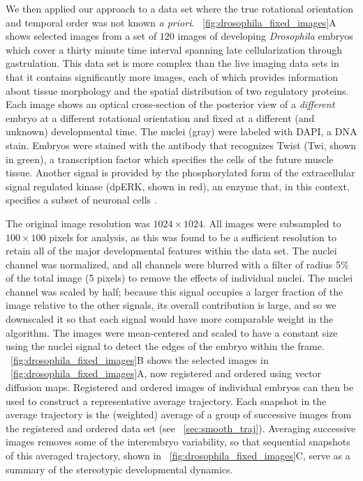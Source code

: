 We then applied our approach to a data set where the true rotational orientation and temporal order was not known {\it a priori}.
%
\fig~\ref{fig:drosophila_fixed_images}A shows selected images from a set of $120$ images of developing {\em Drosophila} embryos which cover a thirty minute time interval spanning late cellularization through gastrulation.
%
This data set is more complex than the live imaging data sets in that it contains significantly more images, each of which provides information about tissue morphology and the spatial distribution of two regulatory proteins.
%
Each image shows an optical cross-section of the posterior view of a {\em different} embryo at a different rotational orientation and fixed at a different (and unknown) developmental time.
%
The nuclei (gray) were labeled with DAPI, a DNA stain.
%
Embryos were stained with the antibody that recognizes Twist (Twi, shown in green), a transcription factor which specifies the cells of the future muscle tissue.
%
Another signal is provided by the phosphorylated form of the extracellular signal regulated kinase (dpERK, shown in red), an enzyme that, in this context, specifies a subset of neuronal cells \citep{Lim2013kinetics}.

The original image resolution was $1024 \times 1024$.
%
All images were subsampled to $100 \times 100$ pixels for analysis, as this was found to be a sufficient resolution to retain all of the major developmental features within the data set. 
%
The nuclei channel was normalized, and all channels were blurred with a filter of radius 5\% of the total image (5 pixels) to remove the effects of individual nuclei. 
%
The nuclei channel was scaled by half; because this signal occupies a larger fraction of the image relative to the other signals, its overall contribution is large, and so we downscaled it so that each signal would have more comparable weight in the algorithm. 
%
The images were mean-centered and scaled to have a constant size using the nuclei signal to detect the edges of the embryo within the frame.
%
\fig~\ref{fig:drosophila_fixed_images}B shows the selected images in \fig~\ref{fig:drosophila_fixed_images}A, now registered and ordered using vector diffusion maps.
%
Registered and ordered images of individual embryos can then be used to construct a representative average trajectory. 
%
Each snapshot in the average trajectory is the (weighted) average of a group of successive images from the registered and ordered data set (see \sec~\ref{sec:smooth_traj}).
%
Averaging successive images removes some of the interembryo variability, so that sequential snapshots of this averaged trajectory, shown in \fig~\ref{fig:drosophila_fixed_images}C, serve as a summary of the stereotypic developmental dynamics.

